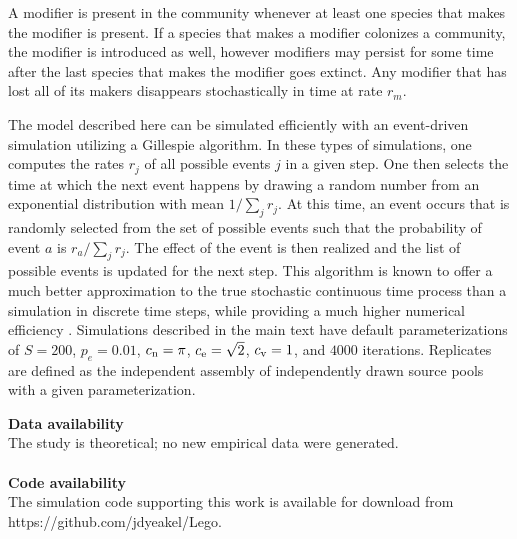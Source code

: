 \documentclass[twocolumn,preprintnumbers,amsmath,amssymb,superscriptaddress,linenumbers]{revtex4-1}
\begin{document}
{  A modifier is present in the community whenever at least one species that makes the modifier is present.
  If a species that makes a modifier colonizes a community, the modifier is introduced as well, however modifiers may persist for some time after the last species that makes the modifier goes extinct.
  Any modifier that has lost all of its makers disappears stochastically in time at rate $r_m$.

  The model described here can be simulated efficiently with an event-driven simulation utilizing a Gillespie algorithm.
  In these types of simulations, one computes the rates $r_j$ of all possible events $j$ in a given step.
  One then selects the time at which the next event happens by drawing a random number from an exponential distribution with mean $1/\sum_j{r_j}$.
  At this time, an event occurs that is randomly selected from the set of possible events such that the probability of event $a$ is $r_a/\sum_j{r_j}$.
  The effect of the event is then realized and the list of possible events is updated for the next step.
  This algorithm is known to offer a much better approximation to the true stochastic continuous time process than a simulation in discrete time steps, while providing a much higher numerical efficiency \cite{Gillespie1977}.
  Simulations described in the main text have default parameterizations of $S=200$, $p_e=0.01$, $c_{\rm n} = \pi$, $c_{\rm e} = \sqrt{2}$, $c_{\rm v} = 1$, and $4000$ iterations.
  Replicates are defined as the independent assembly of independently drawn source pools with a given parameterization.}

\vspace{2mm}
\noindent \textbf{Data availability}\\
  \footnotesize{
  The study is theoretical; no new empirical data were generated.
  }\\ \\
\noindent \textbf{Code availability}\\
  \footnotesize{
  The simulation code supporting this work is available for download from https://github.com/jdyeakel/Lego.
  }\\


\end{document}
